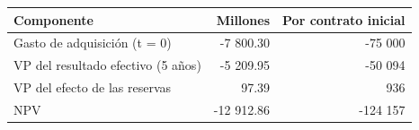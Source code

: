 \begin{tabular}{lrr}
\toprule
Componente & Millones & Por contrato inicial \\
\midrule
Gasto de adquisición (t = 0) & -7 800.30 & -75 000 \\
VP del resultado efectivo (5 años) & -5 209.95 & -50 094 \\
VP del efecto de las reservas & 97.39 & 936 \\
NPV & -12 912.86 & -124 157 \\
\bottomrule
\end{tabular}
